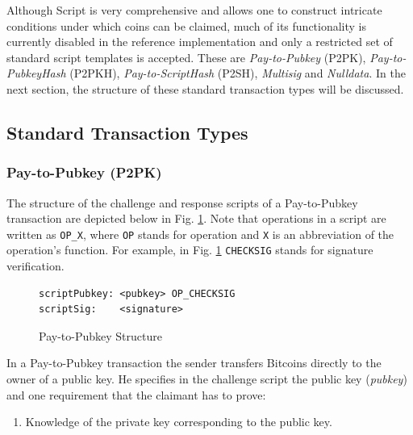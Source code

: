 \noindent
Although Script is very comprehensive and allows one to construct intricate conditions under which coins can be claimed, much of its functionality is currently disabled in the reference implementation and only a restricted set of standard script templates is accepted. These are \textit{Pay-to-Pubkey} (P2PK), \textit{Pay-to-PubkeyHash} (P2PKH), \textit{Pay-to-ScriptHash} (P2SH), \textit{Multisig} and \textit{Nulldata}. In the next section, the structure of these standard transaction types will be discussed.~\\


\clearpage
\enlargethispage{2\baselineskip}
\subsection{Standard Transaction Types} \label{sec:StandardTxTypes}
\vspace{6pt}

\subsubsection{Pay-to-Pubkey (P2PK)} \label{sec:P2PK}
The structure of the challenge and response scripts of a Pay-to-Pubkey transaction are depicted below in Fig. \ref{fig:P2PubStructure}. Note that operations in a script are written as \texttt{OP\_X}, where \texttt{OP} stands for operation and \texttt{X} is an abbreviation of the operation's function. For example, in Fig. \ref{fig:P2PubStructure} \texttt{CHECKSIG} stands for signature verification.

\vspace{-10pt}
\begin{figure}[htbp]

\begin{Verbatim}[fontsize==\relsize{-4}, frame=single]  
scriptPubkey: <pubkey> OP_CHECKSIG
scriptSig:    <signature>
\end{Verbatim}

\vspace{-15pt}
\caption{Pay-to-Pubkey Structure}
\label{fig:P2PubStructure}
\end{figure}
\vspace{-10pt}

\noindent
In a Pay-to-Pubkey transaction the sender transfers Bitcoins directly to the owner of a public key. He specifies in the challenge script the public key (\textit{pubkey}) and one requirement that the claimant has to prove:
\begin{enumerate}[label=\arabic*), leftmargin=1cm]
\item Knowledge of the private key corresponding to the public key.
\end{enumerate}

